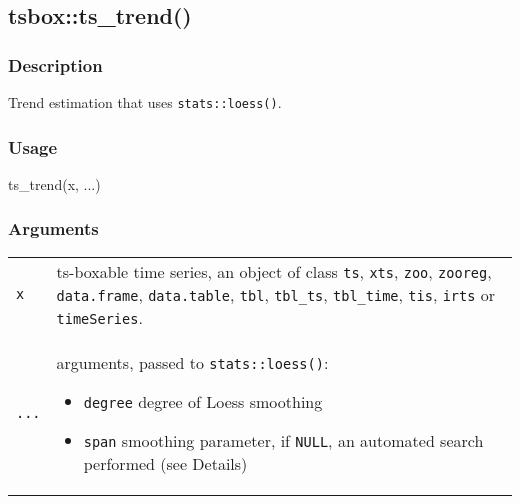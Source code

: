 \documentclass[
  letterpaper,
  DIV=11,
  numbers=noendperiod]{scrreport}
\newenvironment{Shaded}{\begin{snugshade}}{\end{snugshade}}
\newcommand{\FunctionTok}[1]{\textcolor[rgb]{0.28,0.35,0.67}{#1}}
\newcommand{\NormalTok}[1]{\textcolor[rgb]{0.00,0.23,0.31}{#1}}
\begin{document}
\subsection{tsbox::ts\_trend()}\label{tsboxts_trend}

\subsubsection{Description}\label{description-33}

Trend estimation that uses \texttt{stats::loess()}.

\subsubsection{Usage}\label{usage-33}

\begin{Shaded}
\begin{Highlighting}[]
\FunctionTok{ts\_trend}\NormalTok{(x, ...)}
\end{Highlighting}
\end{Shaded}

\subsubsection{Arguments}\label{arguments-33}

\begin{longtable}[]{@{}
  >{\raggedright\arraybackslash}p{}
  >{\raggedright\arraybackslash}p{}@{}}
\toprule\noalign{}
\endhead
\bottomrule\noalign{}
\endlastfoot
\texttt{x} & ts-boxable time series, an object of class \texttt{ts},
\texttt{xts}, \texttt{zoo}, \texttt{zooreg}, \texttt{data.frame},
\texttt{data.table}, \texttt{tbl}, \texttt{tbl\_ts}, \texttt{tbl\_time},
\texttt{tis}, \texttt{irts} or \texttt{timeSeries}. \\
\texttt{...} & \begin{minipage}[t]{\linewidth}\raggedright
arguments, passed to \texttt{stats::loess()}:

\begin{itemize}
\item
  \texttt{degree} degree of Loess smoothing
\item
  \texttt{span} smoothing parameter, if \texttt{NULL}, an automated
  search performed (see Details)
\end{itemize}
\end{minipage} \\
\end{longtable}
\end{document}
